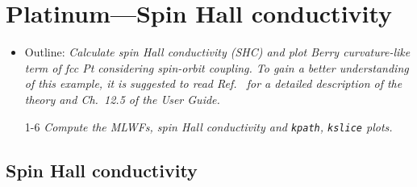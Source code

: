 \section{Platinum---Spin Hall conductivity}
\label{sec29:PtSHC}

\begin{itemize}
	\item Outline: {\it Calculate spin Hall conductivity (SHC) and 
			plot Berry curvature-like term  
			of fcc Pt considering spin-orbit coupling. 
			To gain a better understanding of this example, 
			it is suggested to read Ref.~ for a detailed 
			description of the theory and Ch.~12.5 of the User Guide.}
\end{itemize}

\begin{itemize}
	\item[1-6] {\it Compute the MLWFs, spin Hall conductivity and 
		{\tt kpath}, {\tt kslice} plots.} 
\end{itemize}

\subsection*{Spin Hall conductivity}

